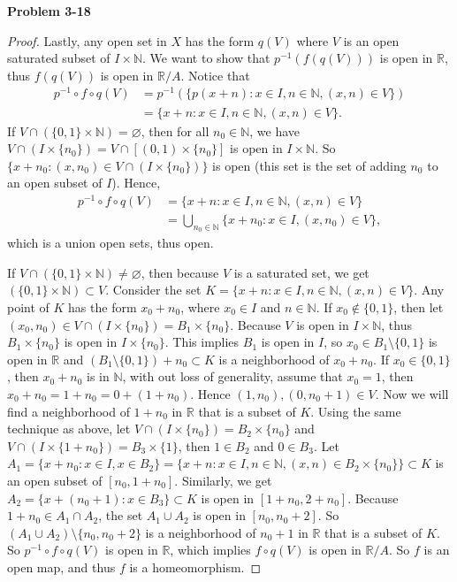 \documentclass[12pt, a4paper]{article}
\theoremstyle{plain}
\newcommand{\N}{\mathbb{N}}
\newcommand{\R}{\mathbb{R}}
\newenvironment{problem}[2][Problem]
    { \begin{mdframed}[backgroundcolor=gray!20] \textbf{#1 #2} \\}
    {  \end{mdframed}}
\begin{document}
\begin{problem}{3-18}
\begin{enumerate}[label=(\alph*)]
\begin{proof}
	Lastly, any open set in $X$ has the form $q(V)$ where $V$ is an open saturated subset of $I\times \N$. We want to show that $p^{-1}(f(q(V)))$ is open in $\R$, thus $f(q(V))$ is open in $\R/A$. Notice that
	\begin{align*}
	p^{-1}\circ f\circ q(V)&=p^{-1}(\{p(x+n):x\in I, n\in\N,(x,n)\in V\})\\
	&=\{x+n:x\in I,n\in \N,(x,n)\in V\}.
	\end{align*}
	If $V\cap (\{0,1\}\times \N)=\varnothing$, then for all $n_0\in \N$, we have $V\cap (I\times \{n_0\})=V\cap [(0,1)\times\{n_0\}]$ is open in $I\times \N$. So $\{x+n_0:(x,n_0)\in V\cap (I\times \{n_0\})\}$ is open (this set is the set of adding $n_0$ to an open subset of $I$). Hence,
	\begin{align*}
	p^{-1}\circ f\circ q(V)&=\{x+n:x\in I,n\in \N,(x,n)\in V\} \\
	&=\bigcup_{n_0\in\N}\{x+n_0:x\in I,(x,n_0)\in V\}, 
	\end{align*}
	which is a union open sets, thus open. 
	
	If $V\cap (\{0,1\}\times \N)\neq \varnothing$, then because $V$ is a saturated set, we get $(\{0,1\}\times \N)\subset V$. Consider the set $K=\{x+n:x\in I,n\in \N,(x,n)\in V\}$. Any point of $K$ has the form $x_0+n_0$, where $x_0\in I$ and $n\in \N$. If $x_0\notin\{0,1\}$, then let $(x_0,n_0)\in V\cap (I\times\{n_0\})=B_1\times \{n_0\}$. Because $V$ is open in $I\times\N$, thus $B_1\times \{n_0\}$ is open in $I\times \{n_0\}$. This implies $B_1$ is open in $I$, so $x_0\in B_1\setminus\{0,1\}$ is open in $\R$ and $(B_1\setminus\{0,1\})+n_0\subset K$ is a neighborhood of $x_0+n_0$. If $x_0\in \{0,1\}$, then $x_0+n_0$ is in $\N$, with out loss of generality, assume that $x_0=1$, then $x_0+n_0=1+n_0=0+(1+n_0)$. Hence $(1,n_0),(0,n_0+1)\in V$. Now we will find a neighborhood of $1+n_0$ in $\R$ that is a subset of $K$. Using the same technique as above, let $V\cap (I\times\{n_0\})=B_2\times \{n_0\}$ and $V\cap (I\times\{1+n_0\})=B_3\times \{1\}$, then $1\in B_2$ and $0\in B_3$. Let $A_1=\{x+n_0:x\in I,x\in B_2\}= \{x+n:x\in I,n\in \N,(x,n)\in B_2\times\{n_0\}\}\subset K$ is an open subset of $[n_0,1+n_0]$. Similarly, we get $A_2=\{x+(n_0+1):x\in B_3\}\subset K$ is open in $[1+n_0,2+n_0]$. Because $1+n_0\in A_1\cap A_2$, the set $A_1\cup A_2$ is open in $[n_0,n_0+2]$. So $(A_1\cup A_2)\setminus\{n_0,n_0+2\}$ is a neighborhood of $n_0+1$ in $\R$ that is a subset of $K$. So $p^{-1}\circ f\circ q(V)$ is open in $\R$, which implies $f\circ q(V)$ is open in $\R/A$. So $f$ is an open map, and thus $f$ is a homeomorphism. 
	

\end{proof}
\end{enumerate}
\end{problem}
\end{document}

